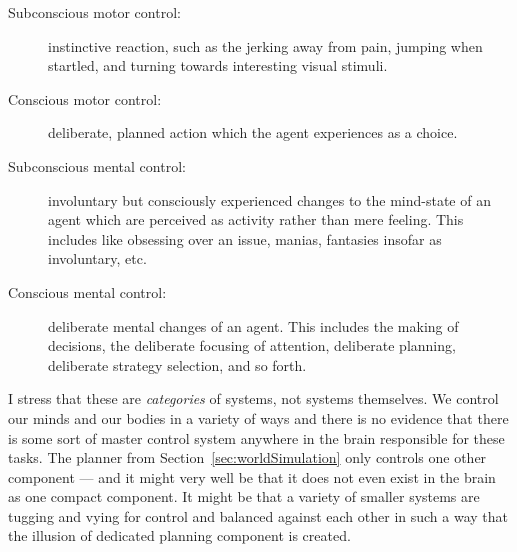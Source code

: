 \begin{description}
	\item[Subconscious motor control:] instinctive reaction, such as the jerking away from pain, jumping when startled, and turning towards interesting visual stimuli.
	\item[Conscious motor control:] deliberate, planned action which the agent experiences as a choice.
	\item[Subconscious mental control:] involuntary but consciously experienced changes to the mind-state of an agent which are perceived as activity rather than mere feeling. This includes like obsessing over an issue, manias, fantasies insofar as involuntary, etc.
	\item[Conscious mental control:] deliberate mental changes of an agent. This includes the making of decisions, the deliberate focusing of attention, deliberate planning, deliberate strategy selection, and so forth.
\end{description}

I stress that these are {\em categories} of systems, not systems themselves. We control our minds and our bodies in a variety of ways and there is no evidence that there is some sort of master control system anywhere in the brain responsible for these tasks. The planner from Section~\ref{sec:worldSimulation} only controls one other component --- and it might very well be that it does not even exist in the brain as one compact component. It might be that a variety of smaller systems are tugging and vying for control and balanced against each other in such a way that the illusion of dedicated planning component is created.
